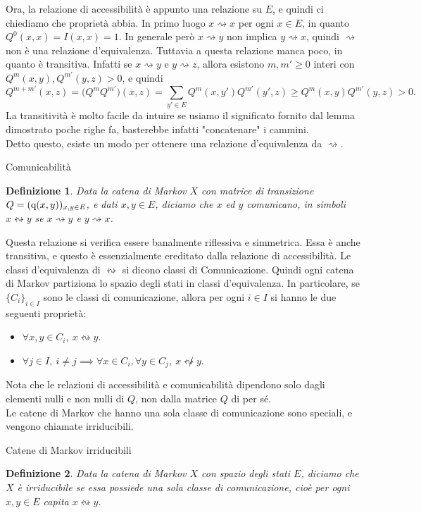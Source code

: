 \documentclass[11pt]{book}
\theoremstyle{Definizione}
\newtheorem*{mydef}{Definizione}
\theoremstyle{TeoremaProposizioneLemmaCorollario}
\theoremstyle{OsservazioneNota}
\newcommand{\conduce}{\rightsquigarrow}
\newcommand{\comunica}{\leftrightsquigarrow}
\newcommand{\q}{\textup{q}}
\begin{document}
\noindent
Ora, la relazione di accessibilità è appunto una relazione su $E$, e quindi ci chiediamo che proprietà abbia. In primo luogo $x \conduce x$ per ogni $x\in E$, in quanto $Q^0(x,x) = I(x,x) = 1$. In generale però $x\conduce y$ non implica $y \conduce x$, quindi $\conduce$ non è una relazione d'equivalenza. Tuttavia a questa relazione manca poco, in quanto è transitiva. Infatti se $x \conduce y$ e $y\conduce z$, allora esistono $m,m'\geq 0$ interi con $Q^m(x,y),Q^{m'}(y,z) > 0$, e quindi
$$
Q^{m+m'}(x,z) = \big(Q^mQ^{m'}\big)(x,z) = \sum_{y'\in E} Q^m(x,y')Q^{m'}(y',z) \geq Q^m(x,y)Q^{m'}(y,z) > 0.
$$
La transitività è molto facile da intuire se usiamo il significato fornito dal lemma dimostrato poche righe fa, basterebbe infatti "concatenare" i cammini.\\
\indent
Detto questo, esiste un modo per ottenere una relazione d'equivalenza da $\conduce$.
\begin{boxdef}{Comunicabilità}
\begin{mydef}
Data la catena di Markov $X$ con matrice di transizione $Q = (\q(x,y))_{x,y\in E}$, e dati $x,y\in E$, diciamo che $x$ ed $y$ comunicano, in simboli $x \comunica y$ se $x \conduce y$ e $y \conduce x$.
\end{mydef}
\end{boxdef}
\noindent
Questa relazione si verifica essere banalmente riflessiva e simmetrica. Essa è anche transitiva, e questo è essenzialmente ereditato dalla relazione di accessibilità. Le classi d'equivalenza di $\comunica$ si dicono classi di Comunicazione. Quindi ogni catena di Markov partiziona lo spazio degli stati in classi d'equivalenza. In particolare, se $\{C_i\}_{i\in I}$ sono le classi di comunicazione, allora per ogni $i\in I$ si hanno le due seguenti proprietà:
\begin{itemize}
\item $\forall x,y\in C_i,\ x\comunica y$.
\item $\forall j\in I,\ i\neq j \implies \forall x \in C_i,\forall y\in C_j,\ x \not \comunica y$.
\end{itemize}
Nota che le relazioni di accessibilità e comunicabilità dipendono solo dagli elementi nulli e non nulli di $Q$, non dalla matrice $Q$ di per sé.\\
Le catene di Markov che hanno una sola classe di comunicazione sono speciali, e vengono chiamate irriducibili.
\begin{boxdef}{Catene di Markov irriducibili}
\begin{mydef}
Data la catena di Markov $X$ con spazio degli stati $E$, diciamo che $X$ è irriducibile se essa possiede una sola classe di comunicazione, cioè per ogni $x,y\in E$ capita $x\comunica y$.
\end{mydef}
\end{boxdef}
\end{document}

